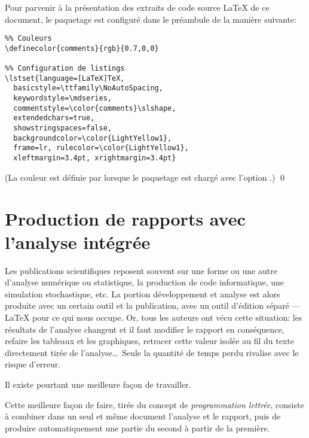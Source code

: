 \begin{exemple}
  \label{ex:trucs:listings}
  Pour parvenir à la présentation des extraits de code source {\LaTeX}
  de ce document, le paquetage  est configuré dans le
  préambule de la manière suivante:
\begin{lstlisting}
%% Couleurs
\definecolor{comments}{rgb}{0.7,0,0}

%% Configuration de listings
\lstset{language=[LaTeX]TeX,
  basicstyle=\ttfamily\NoAutoSpacing,
  keywordstyle=\mdseries,
  commentstyle=\color{comments}\slshape,
  extendedchars=true,
  showstringspaces=false,
  backgroundcolor=\color{LightYellow1},
  frame=lr, rulecolor=\color{LightYellow1},
  xleftmargin=3.4pt, xrightmargin=3.4pt}
\end{lstlisting}
  (La couleur  est définie par  lorsque
  le paquetage est chargé avec l'option .)
  \qed
\end{exemple}



\section{Production de rapports avec l'analyse intégrée}
\label{sec:trucs:sweave}

Les publications scientifiques reposent souvent sur une forme ou une
autre d'analyse numérique ou statistique, la production de code
informatique, une simulation stochastique, etc. La portion
développement et analyse est alors produite avec un certain outil
et la publication, avec un outil d'édition séparé --- {\LaTeX} pour ce
qui nous occupe. Or, tous les auteurs ont vécu cette situation: les
résultats de l'analyse changent et il faut modifier le rapport en
conséquence, refaire les tableaux et les graphiques, retracer cette
valeur isolée au fil du texte directement tirée de l'analyse\dots\
Seule la quantité de temps perdu rivalise avec le risque d'erreur.

Il existe pourtant une meilleure façon de travailler.

Cette meilleure façon de faire, tirée du concept de
\emph{programmation lettrée}, consiste à combiner dans un seul et même
document l'analyse et le rapport, puis de produire automatiquement une
partie du second à partir de la première.

